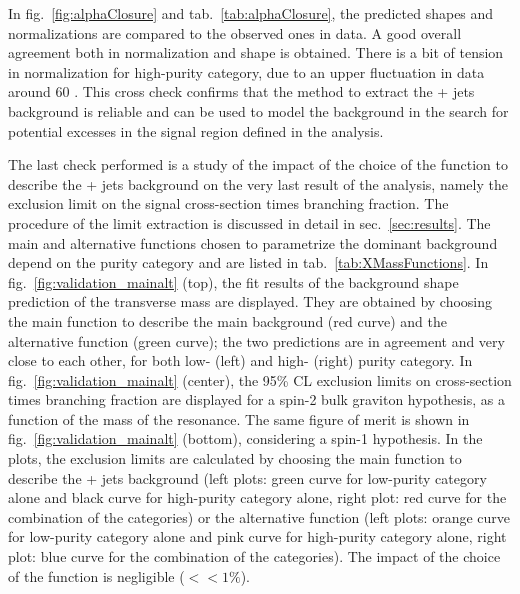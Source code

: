 \noindent In fig.~\ref{fig:alphaClosure} and tab.~\ref{tab:alphaClosure}, the predicted shapes and normalizations are compared to the observed ones in data. 
A good overall agreement both in normalization and shape is obtained. There is a bit of tension in normalization for high-purity category, due to an upper fluctuation in data around 60 \GeV. This cross check confirms that the method to extract the \V + jets background is reliable and can be used to model the background in the search for potential excesses in the signal region defined in the analysis.

\vspace*{1\baselineskip}

\noindent The last check performed is a study of the impact of the choice of the function to describe the \V + jets background on the very last result of the analysis, namely the exclusion limit on the signal cross-section times branching fraction. The procedure of the limit extraction is discussed in detail in sec.~\ref{sec:results}. The main and alternative functions chosen to parametrize the dominant background depend on the purity category and are listed in tab.~\ref{tab:XMassFunctions}. In fig.~\ref{fig:validation_mainalt} (top), the fit results of the background shape prediction of the transverse mass are displayed. They are obtained by choosing the main function to describe the main background (red curve) and the alternative function (green curve); the two predictions are in agreement and very close to each other, for both low- (left) and high- (right) purity category. In fig.~\ref{fig:validation_mainalt} (center), the 95\% CL exclusion limits on cross-section times branching fraction are displayed for a spin-2 bulk graviton hypothesis, as a function of the mass of the resonance. The same figure of merit is shown in fig.~\ref{fig:validation_mainalt} (bottom), considering a spin-1 \Wp hypothesis. In the plots, the exclusion limits are calculated by choosing the main function to describe the \V + jets background (left plots: green curve for low-purity category alone and black curve for high-purity category alone, right plot: red curve for the combination of the categories) or the alternative function (left plots: orange curve for low-purity category alone and pink curve for high-purity category alone, right plot: blue curve for the combination of the categories). The impact of the choice of the function is negligible ($<<1 \%$).


